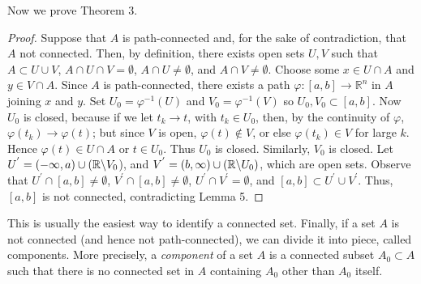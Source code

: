\documentclass[11pt]{article}
\theoremstyle{definition}
\newcommand{\R}{\mathbb{R}}                      %
\begin{document}
Now we prove Theorem 3.
\begin{proof}
    Suppose that $A$ is path-connected and, for the sake of contradiction, that $A$ not connected. Then, by definition, there exists open sets $U,V$ such that $A\subset U\cup V$, $A\cap U \cap V= \emptyset$, $A\cap U \neq \emptyset$, and $A\cap V\neq\emptyset$. Choose some $x\in U\cap A$ and $y\in V\cap A$. Since $A$ is path-connected, there exists a path $\varphi:[a,b]\to\R^n$ in $A$ joining $x$ and $y$. Set $U_0=\varphi^{-1}(U)$ and $V_0=\varphi^{-1}(V)$ so $U_0,V_0\subset[a,b]$. Now $U_0$ is closed, because if we let $t_k\to t$, with $t_k\in U_0$, then, by the continuity of $\varphi$, $\varphi(t_k)\to \varphi(t)$; but since $V$ is open, $\varphi(t)\not\in V$, or else $\varphi(t_k)\in V$ for large $k$. Hence $\varphi(t)\in U\cap A$ or $t\in U_0$. Thus $U_0$ is closed. Similarly, $V_0$ is closed. Let $U^{'}=(-\infty,a)\cup (\R\symbol{92} V_0$), and $V^{'}=(b,\infty)\cup (\R\symbol{92} U_0)$, which are open sets. Observe that $U^{'}\cap [a,b]\neq\emptyset$, $V^{'}\cap[a,b]\neq\emptyset$, $U^{'}\cap V^{'}=\emptyset$, and $[a,b]\subset U^'\cup V^'$. Thus, $[a,b]$ is not connected, contradicting Lemma 5.
\end{proof}
This is usually the easiest way to identify a connected set. Finally, if a set $A$ is not connected (and hence not path-connected), we can divide it into piece, called components. More precisely, a \textit{component} of a set $A$ is a connected subset $A_0\subset A$ such that there is no connected set in $A$ containing $A_0$ other than $A_0$ itself. 
\end{document}
